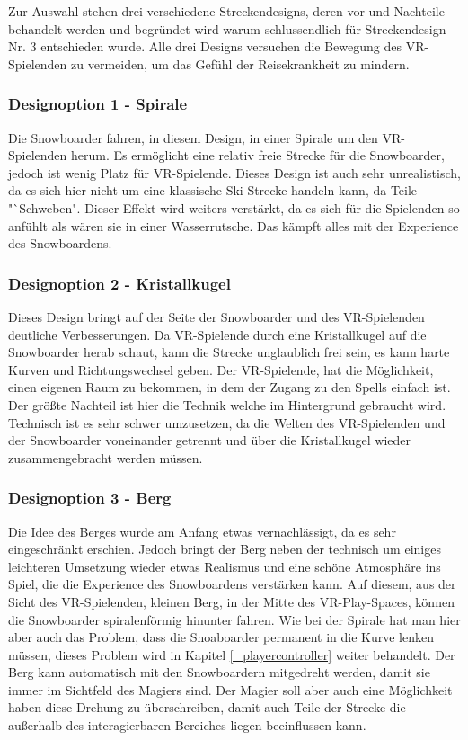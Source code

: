 Zur Auswahl stehen drei verschiedene Streckendesigns, deren vor und Nachteile behandelt werden und begründet wird warum schlussendlich für Streckendesign Nr. 3 entschieden wurde. Alle drei Designs versuchen die Bewegung des VR-Spielenden zu vermeiden, um das Gefühl der Reisekrankheit zu mindern.

\subsubsection{Designoption 1 - Spirale}

Die Snowboarder fahren, in diesem Design, in einer Spirale um den VR-Spielenden herum. Es ermöglicht eine relativ freie Strecke für die Snowboarder, jedoch ist wenig Platz für VR-Spielende. Dieses Design ist auch sehr unrealistisch, da es sich hier nicht um eine klassische Ski-Strecke handeln kann, da Teile "`Schweben". Dieser Effekt wird weiters verstärkt, da es sich für die Spielenden so anfühlt als wären sie in einer Wasserrutsche. Das kämpft alles mit der Experience des Snowboardens.

\subsubsection{Designoption 2 - Kristallkugel}

Dieses Design bringt auf der Seite der Snowboarder und des VR-Spielenden deutliche Verbesserungen. Da VR-Spielende durch eine Kristallkugel auf die Snowboarder herab schaut, kann die Strecke unglaublich frei sein, es kann harte Kurven und Richtungswechsel geben. Der VR-Spielende, hat die Möglichkeit, einen eigenen Raum zu bekommen, in dem der Zugang zu den Spells einfach ist. Der größte Nachteil ist hier die Technik welche im Hintergrund gebraucht wird. Technisch ist es sehr schwer umzusetzen, da die Welten des VR-Spielenden und der Snowboarder voneinander getrennt und über die Kristallkugel wieder zusammengebracht werden müssen.

\subsubsection{Designoption 3 - Berg}

Die Idee des Berges wurde am Anfang etwas vernachlässigt, da es sehr eingeschränkt erschien. Jedoch bringt der Berg neben der technisch um einiges leichteren Umsetzung wieder etwas Realismus und eine schöne Atmosphäre ins Spiel, die die Experience des Snowboardens verstärken kann. Auf diesem, aus der Sicht des VR-Spielenden, kleinen Berg, in der Mitte des VR-Play-Spaces, können die Snowboarder spiralenförmig hinunter fahren. Wie bei der Spirale hat man hier aber auch das Problem, dass die Snoaboarder permanent in die Kurve lenken müssen, dieses Problem wird in Kapitel \ref{_playercontroller} weiter behandelt. Der Berg kann automatisch mit den Snowboardern mitgedreht werden, damit sie immer im Sichtfeld des Magiers sind. Der Magier soll aber auch eine Möglichkeit haben diese Drehung zu überschreiben, damit auch Teile der Strecke die außerhalb des interagierbaren Bereiches liegen beeinflussen kann.

